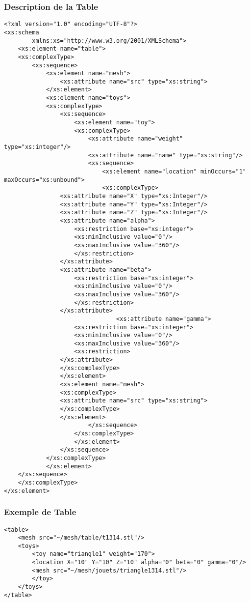 \clearpage
\subsubsection{Description de la Table}
 \begin{lstlisting}[caption=Description de la Table, label=desctable]
<?xml version="1.0" encoding="UTF-8"?>
<xs:schema
        xmlns:xs="http://www.w3.org/2001/XMLSchema">
    <xs:element name="table">
    <xs:complexType>
        <xs:sequence>
            <xs:element name="mesh">
                <xs:attribute name="src" type="xs:string">
            </xs:element>
            <xs:element name="toys">
            <xs:complexType>
                <xs:sequence>
                    <xs:element name="toy">
                    <xs:complexType>
                        <xs:attribute name="weight" type="xs:integer"/>
                        <xs:attribute name="name" type="xs:string"/>
                        <xs:sequence>
                            <xs:element name="location" minOccurs="1" maxOccurs="xs:unbound">
                            <xs:complexType>
				<xs:attribute name="X" type="xs:Integer"/>
				<xs:attribute name="Y" type="xs:Integer"/>
				<xs:attribute name="Z" type="xs:Integer"/>
				<xs:attribute name="alpha">
				    <xs:restriction base="xs:integer">
					<xs:minInclusive value="0"/>
					<xs:maxInclusive value="360"/>
				    </xs:restriction> 
				</xs:attribute>
				<xs:attribute name="beta">
				    <xs:restriction base="xs:integer">
					<xs:minInclusive value="0"/>
					<xs:maxInclusive value="360"/>
				    </xs:restriction>
				</xs:attribute>
                                <xs:attribute name="gamma">
				    <xs:restriction base="xs:integer">
					<xs:minInclusive value="0"/>
					<xs:maxInclusive value="360"/>
				    <xs:restriction>
				</xs:attribute>
			    </xs:complexType>
			    </xs:element>
			    <xs:element name="mesh">
			    <xs:complexType>
				<xs:attribute name="src" type="xs:string">
			    </xs:complexType>
			    </xs:element>
                        </xs:sequence>
                    </xs:complexType>
                    </xs:element>
                </xs:sequence>
            </xs:complexType>
            </xs:element>
	</xs:sequence>
    </xs:complexType>
</xs:element>
\end{lstlisting}
  
\subsubsection{Exemple de Table}
\begin{lstlisting}[caption=Exemple de table, label=desctable]
<table>
    <mesh src="~/mesh/table/t1314.stl"/>
	<toys>
	    <toy name="triangle1" weight="170">
		<location X="10" Y="10" Z="10" alpha="0" beta="0" gamma="0"/>
		<mesh src="~/mesh/jouets/triangle1314.stl"/>
	    </toy>
	</toys>
</table>
\end{lstlisting}
